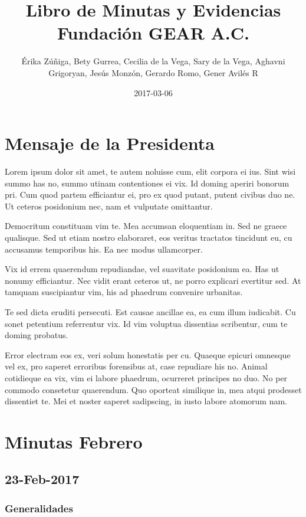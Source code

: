 \documentclass[]{book}
\title{Libro de Minutas y Evidencias Fundación GEAR A.C.}
\author{Érika Zúñiga, Bety Gurrea, Cecilia de la Vega, Sary de la Vega, Aghavni
Grigoryan, Jesús Monzón, Gerardo Romo, Gener Avilés R}
\date{2017-03-06}
\begin{document}
\maketitle

{
\setcounter{tocdepth}{1}
\tableofcontents
}
\chapter{Mensaje de la Presidenta}\label{mensaje-de-la-presidenta}

Lorem ipsum dolor sit amet, te autem noluisse cum, elit corpora ei ius.
Sint wisi summo has no, summo utinam contentiones ei vix. Id doming
aperiri bonorum pri. Cum quod partem efficiantur ei, pro ex quod putant,
putent civibus duo ne. Ut ceteros posidonium nec, nam et vulputate
omittantur.

Democritum constituam vim te. Mea accumsan eloquentiam in. Sed ne graece
qualisque. Sed ut etiam nostro elaboraret, eos veritus tractatos
tincidunt eu, cu accusamus temporibus his. Ea nec modus ullamcorper.

Vix id errem quaerendum repudiandae, vel suavitate posidonium ea. Has ut
nonumy efficiantur. Nec vidit erant ceteros ut, ne porro explicari
evertitur sed. At tamquam suscipiantur vim, his ad phaedrum convenire
urbanitas.

Te sed dicta eruditi persecuti. Est causae ancillae ea, ea cum illum
iudicabit. Cu sonet petentium referrentur vix. Id vim voluptua
dissentias scribentur, cum te doming probatus.

Error electram eos ex, veri solum honestatis per cu. Quaeque epicuri
omnesque vel ex, pro saperet erroribus forensibus at, case repudiare his
no. Animal cotidieque ea vix, vim ei labore phaedrum, ocurreret
principes no duo. No per commodo consetetur quaerendum. Quo oporteat
similique in, mea atqui prodesset dissentiet te. Mei et noster saperet
sadipscing, in iusto labore atomorum nam.

\chapter{Minutas Febrero}\label{intro}

\section{23-Feb-2017}\label{feb-2017}

\subsection{Generalidades}\label{generalidades}
\end{document}
